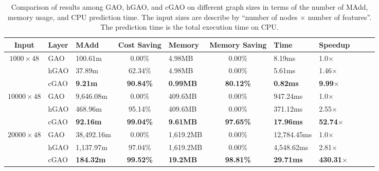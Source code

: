 \documentclass[sigconf]{acmart}
\begin{document}
\begin{table*}[t]
\caption{
Comparison of results among GAO, hGAO, and cGAO on different graph sizes in terms of
the number of MAdd, memory usage, and CPU prediction time. The input sizes are describe
by ``number of nodes $\times$ number of features''. The prediction time is the total
execution time on CPU.}
\label{table:layers_cmp}
\begin{tabularx}{\textwidth}{c lx{2.4cm}  cx{2.4cm} cx{2.2cm} Y Y Y Y}
    \hline
    \textbf{Input} & \textbf{Layer} & \textbf{MAdd} & \textbf{Cost Saving} & \textbf{Memory} & \textbf{Memory Saving} & \textbf{Time} & \textbf{Speedup} \\ \hline\hline
     & GAO     & 100.61m   & 0.00\%   & 4.98MB   &  0.00\%     & 8.19ms       & 1.0$\times$ \\ & hGAO    & 37.89m  & 62.34\%   & 4.98MB   &  0.00\%     & 5.61ms       & 1.46$\times$ \\ & cGAO    & \textbf{9.21m} & \textbf{90.84\%}  & \textbf{0.99MB} & \textbf{80.12\%}  & \textbf{0.82ms} & \textbf{9.99$\times$} \\ \hline
     & GAO     & 9,646.08m   & 0.00\%   & 409.6MB  &  0.00\%     & 947.24ms      & 1.0$\times$  \\ & hGAO    & 468.96m   & 95.14\%  & 409.6MB  &  0.00\%     & 371.12ms       & 2.55$\times$ \\ & cGAO    & \textbf{92.16m} & \textbf{99.04\%} & \textbf{9.61MB} & \textbf{97.65\%} & \textbf{17.96ms} & \textbf{52.74$\times$} \\ \hline
     & GAO     & 38,492.16m  & 0.00\%   & 1,619.2MB  & 0.00\%     & 12,784.45ms   & 1.0$\times$ \\ & hGAO    & 1,137.97m   & 97.04\%  & 1,619.2MB  & 0.00\%     & 4,548.62ms      & 2.81$\times$ \\ & cGAO    & \textbf{184.32m} & \textbf{99.52\%} & \textbf{19.2MB} & \textbf{98.81\%} & \textbf{29.71ms} & \textbf{430.31$\times$} \\ \hline
    \hline
\end{tabularx}
\end{table*}
\end{document}
